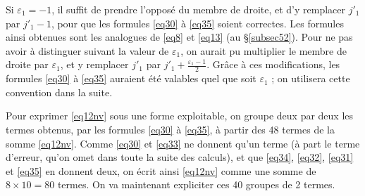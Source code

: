 \documentclass[12pt,francais, reqno]{smfart}
\numberwithin{equation}{section}
\newcommand{\eps}{\varepsilon}
\newcommand{\jprun}{j'_1+\frac{\eps_1-1}{2}}
\begin{document}
Si $\eps_1=-1$, il suffit de prendre l'oppos\'e du membre de droite, et d'y remplacer $j'_1$ par $j'_1-1$, pour que les formules \eqref{eq30} \`a \eqref{eq35} soient correctes. Les formules ainsi obtenues sont les analogues de \eqref{eq8} et \eqref{eq13} (au \S \ref{subsec52}). 
Pour ne pas  avoir \`a distinguer suivant la valeur de $\eps_1$, on aurait pu multiplier le membre de droite par $\eps_1$, et y remplacer $j'_1$ par $\jprun$. Gr\^ace \`a ces modifications, les formules 
 \eqref{eq30} \`a \eqref{eq35} auraient \'et\'e valables quel que soit $\eps_1$ ; on utilisera cette convention dans la suite.
 
Pour exprimer \eqref{eq12nv} sous une forme exploitable, on groupe deux par deux les termes obtenus, par les formules  \eqref{eq30} \`a \eqref{eq35}, \`a partir des 48 termes de la somme \eqref{eq12nv}. Comme \eqref{eq30} et \eqref{eq33} ne donnent qu'un terme (\`a part le terme d'erreur, qu'on omet dans toute la suite des calculs), et que \eqref{eq34}, \eqref{eq32}, \eqref{eq31} et \eqref{eq35} en donnent deux, on \'ecrit ainsi \eqref{eq12nv} comme une somme de $8 \times 10 = 80$ termes. On va maintenant expliciter ces 40 groupes de 2 termes.
\end{document}

